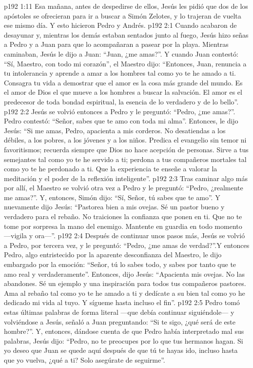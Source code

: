 \vs p192 1:11 Esa mañana, antes de despedirse de ellos, Jesús les pidió que dos de los apóstoles se ofrecieran para ir a buscar a Simón Zelotes, y lo trajeran de vuelta ese mismo día. Y esto hicieron Pedro y Andrés.
\vs p192 2:1 Cuando acabaron de desayunar y, mientras los demás estaban sentados junto al fuego, Jesús hizo señas a Pedro y a Juan para que lo acompañaran a pasear por la playa. Mientras caminaban, Jesús le dijo a Juan: “Juan, ¿me amas?”. Y cuando Juan contestó: “Sí, Maestro, con todo mi corazón”, el Maestro dijo: “Entonces, Juan, renuncia a tu intolerancia y aprende a amar a los hombres tal como yo te he amado a ti. Consagra tu vida a demostrar que el amor es la cosa más grande del mundo. Es el amor de Dios el que mueve a los hombres a buscar la salvación. El amor es el predecesor de toda bondad espiritual, la esencia de lo verdadero y de lo bello”.
\vs p192 2:2 Jesús se volvió entonces a Pedro y le preguntó: “Pedro, ¿me amas?”. Pedro contestó: “Señor, sabes que te amo con toda mi alma”. Entonces, le dijo Jesús: “Si me amas, Pedro, apacienta a mis corderos. No desatiendas a los débiles, a los pobres, a los jóvenes y a los niños. Predica el evangelio sin temor ni favoritismos; recuerda siempre que Dios no hace acepción de personas. Sirve a tus semejantes tal como yo te he servido a ti; perdona a tus compañeros mortales tal como yo te he perdonado a ti. Que la experiencia te enseñe a valorar la meditación y el poder de la reflexión inteligente”.
\vs p192 2:3 Tras caminar algo más por allí, el Maestro se volvió otra vez a Pedro y le preguntó: “Pedro, ¿realmente me amas?”. Y, entonces, Simón dijo: “Sí, Señor, tú sabes que te amo”. Y nuevamente dijo Jesús: “Pastorea bien a mis ovejas. Sé un pastor bueno y verdadero para el rebaño. No traiciones la confianza que ponen en ti. Que no te tome por sorpresa la mano del enemigo. Mantente en guardia en todo momento ---vigila y ora---”.
\vs p192 2:4 Después de continuar unos pasos más, Jesús se volvió a Pedro, por tercera vez, y le preguntó: “Pedro, ¿me amas de verdad?”.Y entonces Pedro, algo entristecido por la aparente desconfianza del Maestro, le dijo embargado por la emoción: “Señor, tú lo sabes todo, y sabes por tanto que te amo real y verdaderamente”. Entonces, dijo Jesús: “Apacienta mis ovejas. No las abandones. Sé un ejemplo y una inspiración para todos tus compañeros pastores. Ama al rebaño tal como yo te he amado a ti y dedícate a su bien tal como yo he dedicado mi vida al tuyo. Y sígueme hasta incluso el fin”.
\vs p192 2:5 Pedro tomó estas últimas palabras de forma literal ---que debía continuar siguiéndole--- y volviéndose a Jesús, señaló a Juan preguntando: “Si te sigo, ¿qué será de este hombre?”. Y, entonces, dándose cuenta de que Pedro había interpretado mal sus palabras, Jesús dijo: “Pedro, no te preocupes por lo que tus hermanos hagan. Si yo deseo que Juan se quede aquí después de que tú te hayas ido, incluso hasta que yo vuelva, ¿qué a ti? Solo asegúrate de seguirme”.
